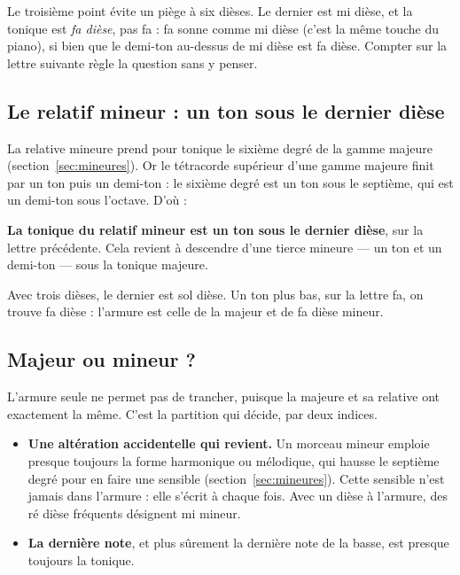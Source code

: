 \documentclass[a4paper,11pt]{article}
\begin{document}
Le troisième point évite un piège à six dièses. Le dernier est mi dièse, et la
tonique est \emph{fa dièse}, pas fa : fa sonne comme mi dièse (c'est la même
touche du piano), si bien que le demi-ton au-dessus de mi dièse est fa dièse.
Compter sur la lettre suivante règle la question sans y penser.

\subsection{Le relatif mineur : un ton sous le dernier dièse}

La relative mineure prend pour tonique le sixième degré de la gamme majeure
(section~\ref{sec:mineures}). Or le tétracorde supérieur d'une gamme majeure
finit par un ton puis un demi-ton : le sixième degré est un ton sous le
septième, qui est un demi-ton sous l'octave. D'où :

\begin{remarque}
\textbf{La tonique du relatif mineur est un ton sous le dernier dièse}, sur
la lettre précédente. Cela revient à descendre d'une tierce mineure — un ton
et un demi-ton — sous la tonique majeure.
\end{remarque}

Avec trois dièses, le dernier est sol dièse. Un ton plus bas, sur la lettre
fa, on trouve fa dièse : l'armure est celle de la majeur et de fa dièse
mineur.

\subsection{Majeur ou mineur ?}

L'armure seule ne permet pas de trancher, puisque la majeure et sa relative ont
exactement la même. C'est la partition qui décide, par deux indices.

\begin{itemize}
  \item \textbf{Une altération accidentelle qui revient.} Un morceau mineur
    emploie presque toujours la forme harmonique ou mélodique, qui hausse le
    septième degré pour en faire une sensible
    (section~\ref{sec:mineures}). Cette sensible n'est jamais dans l'armure :
    elle s'écrit à chaque fois. Avec un dièse à l'armure, des ré dièse
    fréquents désignent mi mineur.
  \item \textbf{La dernière note}, et plus sûrement la dernière note de la
    basse, est presque toujours la tonique.
\end{itemize}
\end{document}
